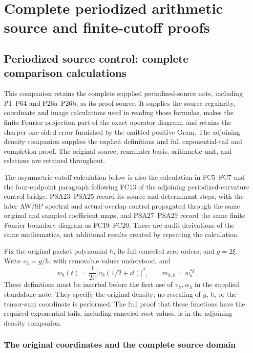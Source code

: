 \begingroup

\section{Complete periodized arithmetic source and finite-cutoff proofs}


\subsection{Periodized source control: complete comparison calculations}
\label{sec:periodized-source-intake-proofs}

This companion retains the complete supplied periodized-source note,
including P1--P64 and P26a--P26b, as its proof source. It supplies the
source regularity, coordinate and image calculations used in reading
those formulas, makes the finite Fourier projection part of the exact
operator diagram, and retains the sharper one-sided error furnished by
the omitted positive Gram. The adjoining density companion supplies the
explicit definitions and full exponential-tail and completion proof.
The original source, remainder basis, arithmetic unit, and relations are
retained throughout.

The asymmetric cutoff calculation below is also the calculation in
FC5--FC7 and the four-endpoint paragraph following FC13 of the adjoining
periodized-curvature control bridge. PSA23--PSA25 record its source
and determinant steps, with the later AW/SP spectral and actual-overlap
control propagated through the same original and sampled coefficient maps, and PSA27--PSA29 record the same finite Fourier
boundary diagram as FC19--FC20. These
are audit derivations of the same mathematics, not additional results
created by repeating the calculation.

Fix the original packet polynomial $h$, its full canceled zero orders,
and $g=2\xi$. Write $v_h=g/h$, with removable values understood, and
\[
 w_h(t)=\frac{1}{2\pi}|v_h(1/2+it)|^2,
 \qquad m_{h,k}=w_h^{*k}.
 \tag{PSA1}
\]
These definitions must be inserted before the first use of $v_h,w_h$ in
the supplied standalone note. They specify the original density; no
rescaling of $g$, $h$, or the tensor-sum coordinate is performed. The
full proof that these functions have the required exponential tails,
including canceled-root values, is in the adjoining density companion.

\subsubsection{The original coordinates and the complete source domain}


